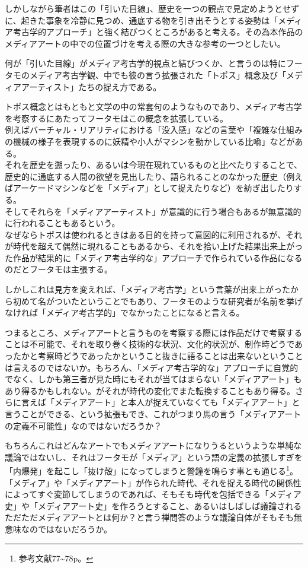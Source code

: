 \documentclass[a4paper,report]{jsbook}
\begin{document}
しかしながら筆者はこの「引いた目線」、歴史を一つの観点で見定めようとせずに、起きた事象を冷静に見つめ、通底する物を引き出そうとする姿勢は「メディア考古学的アプローチ」と強く結びつくところがあると考える。その為本作品のメディアアートの中での位置づけを考える際の大きな参考の一つとしたい。

何が「引いた目線」がメディア考古学的視点と結びつくか、と言うのは特にフータモのメディア考古学観、中でも彼の言う拡張された「トポス」概念及び「メディアアーティスト」たちの捉え方である。

トポス概念とはもともと文学の中の常套句のようなものであり、メディア考古学を考察するにあたってフータモはこの概念を拡張している。\\
例えばバーチャル・リアリティにおける「没入感」などの言葉や「複雑な仕組みの機械の様子を表現するのに妖精や小人がマシンを動かしている比喩」などがある。\\
それを歴史を遡ったり、あるいは今現在現れているものと比べたりすることで、歴史的に通底する人間の欲望を見出したり、語られることのなかった歴史（例えばアーケードマシンなどを「メディア」として捉えたりなど）を紡ぎ出したりする。\\
そしてそれらを「メディアアーティスト」が意識的に行う場合もあるが無意識的に行われることもあるという。\\
なぜならトポスは使われるときはある目的を持って意図的に利用されるが、それが時代を超えて偶然に現れることもあるから、それを拾い上げた結果出来上がった作品が結果的に「メディア考古学的な」アプローチで作られている作品になるのだとフータモは主張する。

しかしこれは見方を変えれば、「メディア考古学」という言葉が出来上がったから初めて名がついたということでもあり、フータモのような研究者が名前を挙げなければ「メディア考古学的」でなかったことになると言える。

つまるところ、メディアアートと言うものを考察する際には作品だけで考察することは不可能で、それを取り巻く技術的な状況、文化的状況が、制作時どうであったかと考察時どうであったかということ抜きに語ることは出来ないということは言えるのではないか。もちろん、「メディア考古学的な」アプローチに自覚的でなく、しかも第三者が見た時にもそれが当てはまらない「メディアアート」もあり得るかもしれない。がそれが時代の変化でまた転換することもあり得る。さらに言えば「メディアアート」と本人が捉えていなくても「メディアアート」と言うことができる、という拡張もでき、これがつまり馬の言う「メディアアートの定義不可能性」なのではないだろうか？

もちろんこれはどんなアートでもメディアアートになりうるというような単純な議論ではないし、それはフータモが「メディア」という語の定義の拡張しすぎを「内爆発」を起こし「抜け殻」になってしまうと警鐘を鳴らす事とも通じる\footnote{参考文献\autocite{huhtamo:mediaarcheology}77\textasciitilde{}78p。}。「メディア」や「メディアアート」が作られた時代、それを捉える時代の関係性によってすぐ変節してしまうのであれば、そもそも時代を包括できる「メディア史」や「メディアアート史」を作ろうとすること、あるいはしばしば議論されるただただメディアアートとは何か？と言う禅問答のような議論自体がそもそも無意味なのではないだろうか。
\end{document}
